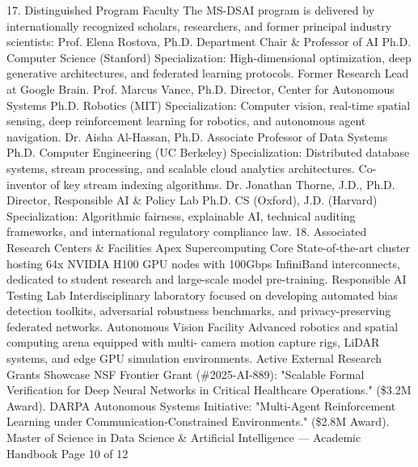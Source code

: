 \documentclass[12pt]{article}
\begin{document}
17. Distinguished Program Faculty
The MS-DSAI program is delivered by internationally recognized scholars, researchers, and former principal industry
scientists:
Prof. Elena Rostova, Ph.D.
Department Chair \& Professor of AI
Ph.D. Computer Science (Stanford)
Specialization: High-dimensional optimization, deep generative
architectures, and federated learning protocols. Former
Research Lead at Google Brain.
Prof. Marcus Vance, Ph.D.
Director, Center for Autonomous Systems
Ph.D. Robotics (MIT)
Specialization: Computer vision, real-time spatial sensing, deep
reinforcement learning for robotics, and autonomous agent
navigation.
Dr. Aisha Al-Hassan, Ph.D.
Associate Professor of Data Systems
Ph.D. Computer Engineering (UC Berkeley)
Specialization: Distributed database systems, stream
processing, and scalable cloud analytics architectures. Co-
inventor of key stream indexing algorithms.
Dr. Jonathan Thorne, J.D., Ph.D.
Director, Responsible AI \& Policy Lab
Ph.D. CS (Oxford), J.D. (Harvard)
Specialization: Algorithmic fairness, explainable AI, technical
auditing frameworks, and international regulatory compliance
law.
18. Associated Research Centers \& Facilities
Apex Supercomputing Core
State-of-the-art cluster hosting 64x
NVIDIA H100 GPU nodes with 100Gbps
InfiniBand interconnects, dedicated to
student research and large-scale model
pre-training.
Responsible AI Testing Lab
Interdisciplinary laboratory focused on
developing automated bias detection
toolkits, adversarial robustness
benchmarks, and privacy-preserving
federated networks.
Autonomous Vision Facility
Advanced robotics and spatial
computing arena equipped with multi-
camera motion capture rigs, LiDAR
systems, and edge GPU simulation
environments.
Active External Research Grants Showcase
NSF Frontier Grant (\#2025-AI-889): "Scalable Formal Verification for Deep Neural Networks in Critical Healthcare
Operations." (\$3.2M Award).
DARPA Autonomous Systems Initiative: "Multi-Agent Reinforcement Learning under Communication-Constrained
Environments." (\$2.8M Award).
Master of Science in Data Science \& Artificial Intelligence — Academic Handbook
Page 10 of 12
\end{document}
